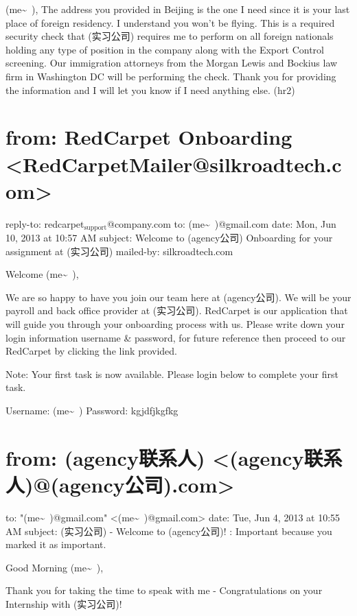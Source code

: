 \documentclass[12pt]{book}
\begin{document}
(me\textasciitilde{}~),
The address you provided in Beijing is the one I need since it is your last place of foreign residency.  I understand you won't be flying. This is a required security check that (实习公司) requires me to perform on all foreign nationals holding any type of position in the company along with the Export Control screening.  Our immigration attorneys from the Morgan Lewis and Bockius law firm in Washington DC will be performing the check. Thank you for providing the information and I will let you know if I need anything else.
(hr2)


\section{from:         RedCarpet Onboarding <RedCarpetMailer@silkroadtech.com>}
\label{sec-39-6}
reply-to:         redcarpet$_{\text{support}}$@company.com
to:         (me\textasciitilde{}~)@gmail.com
date:         Mon, Jun 10, 2013 at 10:57 AM
subject:         Welcome to (agency公司) Onboarding for your assignment at (实习公司)
mailed-by:         silkroadtech.com

Welcome (me\textasciitilde{}~),

We are so happy to have you join our team here at (agency公司).  We will be your payroll and back office provider at (实习公司). RedCarpet is our application that will guide you through your onboarding process with us. Please write down your login information username \& password, for future reference then proceed to our RedCarpet by clicking the link provided.

Note:  Your first task is now available.  Please login below to complete your first task.

Username: (me\textasciitilde{}~)
Password: kgjdfjkgfkg


\section{from:         (agency联系人) <(agency联系人)@(agency公司).com>}
\label{sec-39-7}
to:         "(me\textasciitilde{}~)@gmail.com" <(me\textasciitilde{}~)@gmail.com>
date:         Tue, Jun 4, 2013 at 10:55 AM
subject:         (实习公司) - Welcome to (agency公司)!
:         Important because you marked it as important.

Good Morning (me\textasciitilde{}~),

Thank you for taking the time to speak with me - Congratulations on your Internship with (实习公司)!
\end{document}

